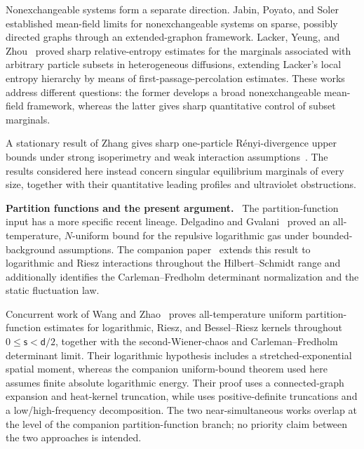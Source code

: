 \documentclass[11pt,reqno]{amsart}
\numberwithin{equation}{section}
\theoremstyle{plain}
\theoremstyle{remark}
\renewcommand{\d}{\mathsf{d}}
\newcommand{\s}{\mathsf{s}}
\newcommand{\parheading}[1]{\par\medskip\noindent\textbf{#1}\ }
\begin{document}
Nonexchangeable systems form a separate direction.  Jabin, Poyato, and Soler~\cite{JabinPoyatoSoler2025} established mean-field limits for nonexchangeable systems on sparse, possibly directed graphs through an extended-graphon framework.  Lacker, Yeung, and Zhou~\cite{LackerYeungZhou2024} proved sharp relative-entropy estimates for the marginals associated with arbitrary particle subsets in heterogeneous diffusions, extending Lacker's local entropy hierarchy by means of first-passage-percolation estimates.  These works address different questions: the former develops a broad nonexchangeable mean-field framework, whereas the latter gives sharp quantitative control of subset marginals.

  A stationary result of Zhang gives sharp one-particle R\'enyi-divergence upper bounds under strong isoperimetry and weak interaction assumptions~\cite{Zhang2026Renyi}.  The results considered here instead concern singular equilibrium marginals of every size, together with their quantitative leading profiles and ultraviolet obstructions.

\parheading{Partition functions and the present argument.}
The partition-function input has a more specific recent lineage.  Delgadino and Gvalani~\cite[Theorem~2.5]{DelgadinoGvalani2025Log} proved an all-temperature, \(N\)-uniform bound for the repulsive logarithmic gas under bounded-background assumptions.  The companion paper~\cite{DGR26} extends this result to logarithmic and Riesz interactions throughout the Hilbert--Schmidt range and additionally identifies the Carleman--Fredholm determinant normalization and the static fluctuation law.

Concurrent work of Wang and Zhao~\cite[Assumption~A and Theorems~1.1 and~1.3]{WangZhao2026Partition} proves all-temperature uniform partition-function estimates for logarithmic, Riesz, and Bessel--Riesz kernels throughout \(0\le\s<\d/2\), together with the second-Wiener-chaos and Carleman--Fredholm determinant limit.  Their logarithmic hypothesis includes a stretched-exponential spatial moment, whereas the companion uniform-bound theorem used here assumes finite absolute logarithmic energy.  Their proof uses a connected-graph expansion and heat-kernel truncation, while \cite{DGR26} uses positive-definite truncations and a low/high-frequency decomposition.  The two near-simultaneous works overlap at the level of the companion partition-function branch; no priority claim between the two approaches is intended.
\end{document}
